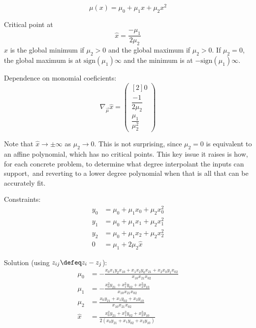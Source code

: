 
\begin{equation}
\mu(x) = \mu_0 + \mu_1 x + \mu_2 x^2
\end{equation}

Critical point at
\begin{equation}
\hat{x} = \frac{- \mu_1}{2 \mu_2}
\end{equation}
$\hat{x}$ is the global minimum if $\mu_2>0$ 
and the global maximum if $\mu_2>0$.
If $\mu_2 = 0$, the global maximum is at 
$\text{sign}(\mu_1)\infty$
and the minimum is at $-\text{sign}(\mu_1)\infty$.

Dependence on monomial coeficients:
\begin{equation}
\nabla_{\vec{\mu}} \hat{x} =
\begin{pmatrix}[2]
0 
\\
\dfrac{-1}{2 \mu_2} 
\\
\dfrac{\mu_1}{\mu_2^2}
\end{pmatrix}
\end{equation}

Note that $\hat{x} \to  \pm \infty$ as $\mu_2 \to 0$. 
This is not surprising, since $\mu_2 = 0$ is equivalent to
an affine polynomial, which has no critical points.
This key issue it raises is how, for each concrete problem,
to determine what degree interpolant the inputs can support,\
and reverting to a lower degree polynomial when that is all that
can be accurately fit.

\setcounter{currentlevel}{\value{baseSectionLevel}-3}
\label{sec:monomial-yyy}

Constraints:
\begin{align}
y_0 & = \mu_0+\mu_1 x_0+\mu_2 x_0^{2}  
\\
y_1 & = \mu_0+\mu_1 x_1+\mu_2 x_1^{2}  
\nonumber 
\\
y_2 & = \mu_0+\mu_1 x_2+\mu_2 x_2^{2}  
\nonumber 
\\
0 & = \mu_1 + 2 \mu_2 \hat{x}  
\nonumber 
\end{align}

Solution (using $z_{ij} \defeq z_i - z_j$):
\begin{align}
\mu_0 & =
- \frac{
x_0 x_1 y_2 x_{10}
+
x_1 x_2 y_0 x_{21}
+
x_2 x_0 y_1 x_{02}
}{
x_{10} x_{21} x_{02}
} 
\\
\mu_1 & =
- \frac{
x_0^{2} y_{21}
+ 
x_1^{2} y_{02} 
+
x_2^{2} y_{10}
}{
x_{10} x_{21} x_{02}
} 
\nonumber \\
\mu_2 & = 
\frac{
x_0 y_{21} 
+
x_1 y_{02}
+
x_2 y_{10} 
}{
x_{10} x_{21} x_{02}
 } 
\nonumber  \\ 
 \hat{x} & = 
\frac{
x_0^{2} y_{21} 
 +
x_1^{2} y_{02} 
 +
x_2^{2} y_{10} 
}{
2 \left(
x_0 y_{21} 
+ 
x_1 y_{02} 
+ 
x_2 y_{10}  
\right)
}
\nonumber 
\end{align}

